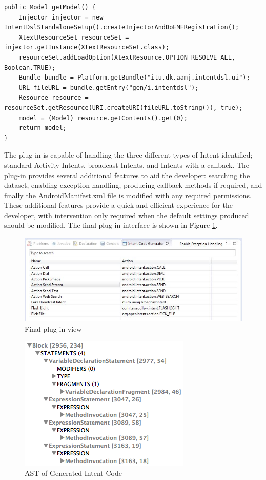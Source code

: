 {\footnotesize\begin{lstlisting}[label=loadingDsl,caption=Loading a DSL object into Java application]
public Model getModel() {
	Injector injector = new IntentDslStandaloneSetup().createInjectorAndDoEMFRegistration();
	XtextResourceSet resourceSet = injector.getInstance(XtextResourceSet.class);
	resourceSet.addLoadOption(XtextResource.OPTION_RESOLVE_ALL, Boolean.TRUE);
	Bundle bundle = Platform.getBundle("itu.dk.aamj.intentdsl.ui");
	URL fileURL = bundle.getEntry("gen/i.intentdsl");
	Resource resource = resourceSet.getResource(URI.createURI(fileURL.toString()), true);
	model = (Model) resource.getContents().get(0);
	return model;
}
\end{lstlisting}}

The plug-in is capable of handling the three different types of Intent identified; standard Activity Intents, broadcast Intents, and Intents with a callback. The plug-in provides several additional features to aid the developer: searching the dataset, enabling exception handling, producing callback methods if required, and finally the AndroidManifest.xml file is modified with any required permissions. These additional features provide a quick and efficient experience for the developer, with intervention only required when the default settings produced should be modified. The final plug-in interface is shown in Figure \ref{codegeneratorview}.

\begin{figure}[t]
\label{codegeneratorview}
  \centering
    \includegraphics[width=\textwidth]{codegenerator}
  \caption{Final plug-in view}
\end{figure}

\begin{figure}[t]
\label{intenttreeview}
  \centering
    \includegraphics[width=.5\textwidth]{ast}
  \caption{AST of Generated Intent Code}
\end{figure}

